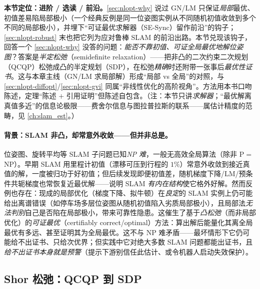 \begin{note}
\textbf{本节定位：进阶 / 选读 / 前沿。}\;\cref{sec:nlopt-why} 说过 GN/LM 只保证\emph{局部}最优、初值差易陷局部极小（一个经典反例是同一位姿图实例从不同随机初值收敛到多个不同的局部极小），并埋下“可证最优求解器（SE-Sync）留作前沿”的钩子；\cref{sec:nlopt-robust} 末也把它列为应对鲁棒 SLAM 的前沿出路。本节兑现该钩子，回答一个 \cref{sec:nlopt-why} 没答的问题：\emph{能否不靠初值、可证全局最优地解位姿图}？答案是\emph{半定松弛}（semidefinite relaxation）——把非凸的二次约束二次规划（QCQP）松弛成凸的半定规划（SDP），在松弛\emph{精确}时还附带一张事后\emph{最优性证书}。这与本章主线（GN/LM 求局部解）形成“局部 vs 全局”的对照，与 \cref{sec:nlopt-diffopt}/\cref{sec:nlopt-gvi} 同属“非线性优化的高阶视角”。方法用本书口吻陈述，定理“陈述 $+$ 引用证明”但陈述自包含。（注：本节只讲\emph{求解器}；“最优解离真值多近”的信息论极限——费舍尔信息与图拉普拉斯的联系——属估计精度的范畴，见 \cref{ch:slam_est}。）
\end{note}

\paragraph{背景：SLAM 非凸，却常意外收敛——但并非总是。}\cite{carlone2026handbook,rosen2019sesync}
位姿图、旋转平均等 SLAM 子问题已知\emph{NP 难}，一般无高效全局算法（除非 P$=$NP）。早期 SLAM 用里程计初值（漂移可压到行程的 $1\%$）常意外收敛到接近真值的解，一度被归功于好初值；但后续发现即便初值差，随机梯度下降/LM/预条件共轭梯度也常恢复近最优解——说明 SLAM \emph{有内在结构}使它格外好解。然而反例也存在：现成的局部优化（梯度下降、拟牛顿）在\emph{良定}的 SLAM 实例上仍可能给出离谱错误（如停车场多层位姿图从随机初值陷入劣质局部极小\cite{rosen2019sesync}），且局部法\emph{无法判别}自己是否陷在局部极小，带来可靠性隐患。这催生了基于\emph{凸松弛}（而非局部优化）的\emph{可证最优}（certifiably correct/optimal）方法：算出解后能量化其离全局最优有多远、甚至证明其为全局最优。这不与 NP 难矛盾——最坏情形下它仍可能给不出证书、只给次优界；但实践中它对绝大多数 SLAM 问题都能出证书，且\emph{给不出证书本身就是预警}（提示下游别信任此估计、或令机器人启动失效保护）。

\subsection{Shor 松弛：QCQP 到 SDP}
\label{sec:nlopt-certifiable-shor}

